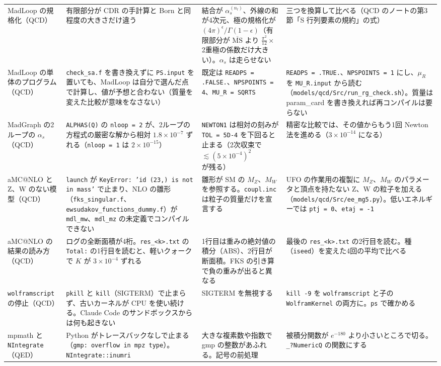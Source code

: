 \documentclass[a4paper,10pt]{ltjsarticle}
\begin{document}
\begin{table}[tbp]
\begin{tabularx}{\linewidth}{>{\raggedright\arraybackslash}p{2.4cm}>{\raggedright\arraybackslash}X>{\raggedright\arraybackslash}X>{\raggedright\arraybackslash}X}
MadLoop の規格化（QCD） & 有限部分が CDR の手計算と Born と同程度の大きさだけ違う & 結合が $\alpha_s^{(n_l)}$、外線の和が4次元、極の規格化が $(4\pi)^\epsilon/\Gamma(1-\epsilon)$（有限部分が $\overline{\mathrm{MS}}$ より $\frac{\pi^2}{12}\times$ 2重極の係数だけ大きい）。$\alpha_s$ は走らせない & 三つを換算して比べる（QCD のノートの第3節「S 行列要素の規約」の式） \\
MadLoop の単体のプログラム（QCD） & \texttt{check\_sa.f} を書き換えずに \texttt{PS.input} を置いても、MadLoop は自分で選んだ点で計算し、値が予想と合わない（質量を変えた比較が意味をなさない） & 既定は \texttt{READPS = .FALSE.}、\texttt{NPSPOINTS = 4}、\texttt{MU\_R = SQRTS} & \texttt{READPS = .TRUE.}、\texttt{NPSPOINTS = 1} にし、$\mu_R$ を \texttt{MU\_R.input} から読む（\nolinkurl{models/qcd/Src/run_rg_check.sh}）。質量は param\_card を書き換えれば再コンパイルは要らない \\
MadGraph の2ループの $\alpha_s$（QCD） & \texttt{ALPHAS(Q)} の \texttt{nloop = 2} が、2ループの方程式の厳密な解から相対 $1.8\times10^{-7}$ ずれる（\texttt{nloop = 1} は $2\times10^{-15}$） & \texttt{NEWTON1} は相対の刻みが \texttt{TOL = 5D-4} を下回ると止まる（2次収束で $\lesssim(5\times10^{-4})^2$ が残る） & 精密な比較では、その値からもう1回 Newton 法を進める（$3\times10^{-14}$ になる） \\
aMC@NLO と Z、W のない模型（QCD） & \texttt{launch} が \texttt{KeyError: 'id (23,) is not in mass'} で止まり、NLO の雛形（\texttt{fks\_singular.f}、\texttt{ewsudakov\_functions\_dummy.f}）が \texttt{mdl\_mw}、\texttt{mdl\_mz} の未定義でコンパイルできない & 雛形が SM の $M_Z$、$M_W$ を参照する。\texttt{coupl.inc} は粒子の質量だけを宣言する & UFO の作業用の複製に $M_Z$、$M_W$ のパラメータと頂点を持たない Z、W の粒子を加える（\nolinkurl{models/qcd/Src/ee_mg5.py}）。低いエネルギーでは \texttt{ptj = 0}、\texttt{etaj = -1} \\
aMC@NLO の結果の読み方（QCD） & ログの全断面積が4桁。\texttt{res\_<k>.txt} の \texttt{Total:} の1行目を読むと、軽いクォークで $K$ が $3\times10^{-4}$ ずれる & 1行目は重みの絶対値の積分（ABS）、2行目が断面積。FKS の引き算で負の重みが出ると異なる & 最後の \texttt{res\_<k>.txt} の2行目を読む。種（\texttt{iseed}）を変えた4回の平均で比べる \\
\texttt{wolframscript} の停止（QCD） & \texttt{pkill} と \texttt{kill}（SIGTERM）で止まらず、古いカーネルが CPU を使い続ける。Claude Code のサンドボックスからは何も起きない & SIGTERM を無視する & \texttt{kill -9} を \texttt{wolframscript} と子の \texttt{WolframKernel} の両方に。\texttt{ps} で確かめる \\
mpmath と \texttt{NIntegrate}（QED） & Python がトレースバックなしで止まる（\texttt{gmp: overflow in mpz type}）。\texttt{NIntegrate::inumri} & 大きな複素数や指数で gmp の整数があふれる。記号の前処理 & 被積分関数が $e^{-180}$ より小さいところで切る。\texttt{\_?NumericQ} の関数にする \\
\bottomrule
\end{tabularx}
\end{table}
\end{document}

